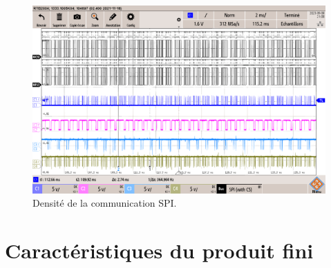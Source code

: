 \begin{figure}[H]
	\centering
	\includegraphics[width=0.7\linewidth]{../figures/mesures/SPI/densite-comm}
	\caption{Densité de la communication SPI.}
	\label{fig:densite-comm}
\end{figure}



\section{Caractéristiques du produit fini} \label{sec:Carac-finis}